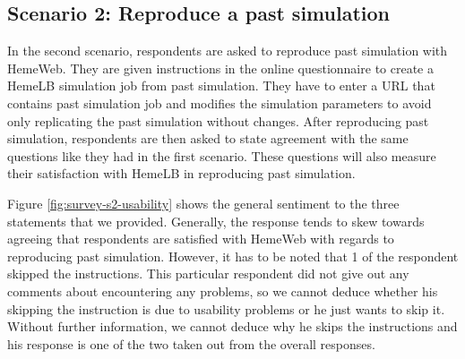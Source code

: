 \subsection{Scenario 2: Reproduce a past simulation}

In the second scenario, respondents are asked to reproduce past simulation with HemeWeb. They are given instructions in the online questionnaire to create a HemeLB simulation job from past simulation. They have to enter a URL that contains past simulation job and modifies the simulation parameters to avoid only replicating the past simulation without changes. After reproducing past simulation, respondents are then asked to state agreement with the same questions like they had in the first scenario. These questions will also measure their satisfaction with HemeLB in reproducing past simulation.


\vspace{0.5cm}

\noindent%
\begin{minipage}{\linewidth}%
 \label{fig:survey-s2-usability}%
\end{minipage}
\vspace{0.5cm}

Figure \ref{fig:survey-s2-usability} shows the general sentiment to the three statements that we provided. Generally, the response tends to skew towards agreeing that respondents are satisfied with HemeWeb with regards to reproducing past simulation. However, it has to be noted that 1 of the respondent skipped the instructions. This particular respondent did not give out any comments about encountering any problems, so we cannot deduce whether his skipping the instruction is due to usability problems or he just wants to skip it. Without further information, we cannot deduce why he skips the instructions and his response is one of the two taken out from the overall responses.

